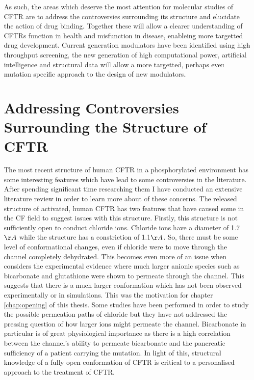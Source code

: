 As such, the areas which deserve the most attention for molecular studies of CFTR are to address the controversies surrounding its structure and elucidate the action of drug binding. Together these will allow a clearer understanding of CFTRs function in health and misfunction in disease, enableing more targetted drug development. Current generation modulators have been identified using high throughput screening, the new generation of high computational power, artificial intelligence and structural data will allow a more targetted, perhaps even mutation specific approach to the design of new modulators.

\section{Addressing Controversies Surrounding the Structure of CFTR}
The most recent structure of human CFTR in a phosphorylated environment has some interesting features which have lead to some controversies in the literature. After spending significant time researching them I have conducted an extensive literature review in order to learn more about of these concerns. The released structure of activated, human CFTR has two features that have caused some in the CF field to suggest issues with this structure. Firstly, this structure is not sufficiently open to conduct chloride ions. Chloride ions have a diameter of 1.7$\AA$ while the structure has a constriction of 1.1$\AA$\cite{Zhang2018}. So, there must be some level of conformational changes, even if chloride were to move through the channel completely dehydrated. This becomes even more of an issue when considers the experimental evidence where much larger anionic species such as bicarbonate and glutathione were shown to permeate through the channel\cite{kogan2003}. This suggests that there is a much larger conformation which has not been observed experimentally or in simulations. This was the motivation for chapter \ref{chap:opening} of this thesis. Some studies have been performed in order to study the possible permeation paths of chloride but they have not addressed the pressing question of how larger ions might permeate the channel. Bicarbonate in particular is of great physiological importance as there is a high correlation between the channel's ability to permeate bicarbonate and the pancreatic sufficiency of a patient carrying the mutation. In light of this, structural knowledge of a fully open conformation of CFTR is critical to a personalised approach to the treatment of CFTR.

